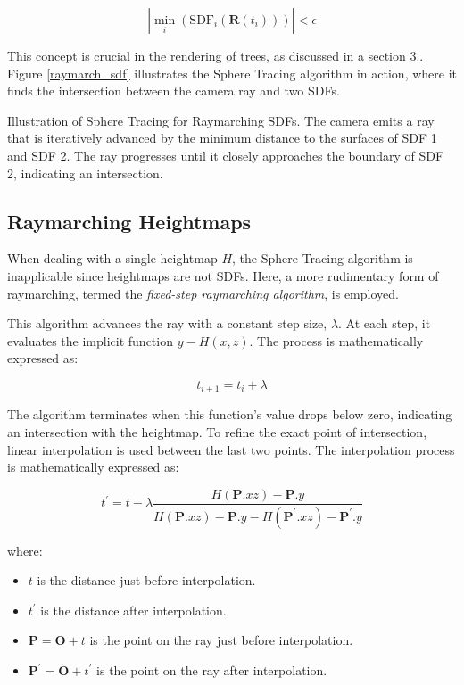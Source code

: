\begin{equation}
|\min_{i}(\text{SDF}_i(\mathbf{R}(t_i)))| < \epsilon 
\end{equation}

This concept is crucial in the rendering of trees, as discussed in a section 3.\todo{}. Figure \ref{raymarch_sdf} illustrates the Sphere Tracing algorithm in action, where it finds the intersection between the camera ray and two SDFs. 

{Illustration of Sphere Tracing for Raymarching SDFs. The camera emits a ray that is iteratively advanced by the minimum distance to the surfaces of SDF 1 and SDF 2. The ray progresses until it closely approaches the boundary of SDF 2, indicating an intersection.}

\subsection{Raymarching Heightmaps}

When dealing with a single heightmap $H$, the Sphere Tracing algorithm is inapplicable since heightmaps are not SDFs. Here, a more rudimentary form of raymarching, termed the \textit{fixed-step raymarching algorithm}, is employed.

This algorithm advances the ray with a constant step size, $\lambda$. At each step, it evaluates the implicit function $y-H(x,z)$. The process is mathematically expressed as:

\begin{equation}
    t_{i+1} = t_{i} + \lambda
\end{equation}

The algorithm terminates when this function's value drops below zero, indicating an intersection with the heightmap. To refine the exact point of intersection, linear interpolation is used between the last two points. The interpolation process is mathematically expressed as:

\begin{equation}
t^\prime = t - \lambda \frac{H(\mathbf{P}.xz) - \mathbf{P}.y}
    {H(\mathbf{P}.xz) - \mathbf{P}.y - H(\mathbf{P^\prime}.xz) - \mathbf{P^\prime}.y}
\end{equation}

where:
\begin{itemize}
    \item $t$ is the distance just before interpolation.
    \item $t^\prime$ is the distance after interpolation.
    \item $\mathbf{P}=\mathbf{O}+t$ is the point on the ray just before interpolation.
    \item $\mathbf{P^\prime}=\mathbf{O}+t^\prime$ is the point on the ray after interpolation.
\end{itemize}

